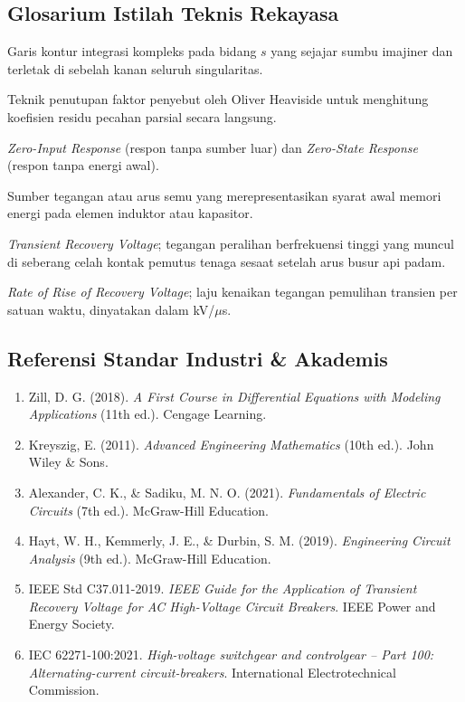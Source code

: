 \documentclass[11pt,a4paper]{article}
\theoremstyle{definition}
\begin{document}
\subsection{Glosarium Istilah Teknis Rekayasa}
\begin{description}[leftmargin=!,labelwidth=3.5cm]
    \item[Bromwich Contour] Garis kontur integrasi kompleks pada bidang $s$ yang sejajar sumbu imajiner dan terletak di sebelah kanan seluruh singularitas.
    \item[Cover-up Method] Teknik penutupan faktor penyebut oleh Oliver Heaviside untuk menghitung koefisien residu pecahan parsial secara langsung.
    \item[ZIR / ZSR] \textit{Zero-Input Response} (respon tanpa sumber luar) dan \textit{Zero-State Response} (respon tanpa energi awal).
    \item[Fictitious Source] Sumber tegangan atau arus semu yang merepresentasikan syarat awal memori energi pada elemen induktor atau kapasitor.
    \item[TRV] \textit{Transient Recovery Voltage}; tegangan peralihan berfrekuensi tinggi yang muncul di seberang celah kontak pemutus tenaga sesaat setelah arus busur api padam.
    \item[RRRV] \textit{Rate of Rise of Recovery Voltage}; laju kenaikan tegangan pemulihan transien per satuan waktu, dinyatakan dalam kV/$\mu$s.
\end{description}

\subsection{Referensi Standar Industri \& Akademis}
\begin{enumerate}[leftmargin=*]
    \item Zill, D. G. (2018). \textit{A First Course in Differential Equations with Modeling Applications} (11th ed.). Cengage Learning.
    \item Kreyszig, E. (2011). \textit{Advanced Engineering Mathematics} (10th ed.). John Wiley \& Sons.
    \item Alexander, C. K., \& Sadiku, M. N. O. (2021). \textit{Fundamentals of Electric Circuits} (7th ed.). McGraw-Hill Education.
    \item Hayt, W. H., Kemmerly, J. E., \& Durbin, S. M. (2019). \textit{Engineering Circuit Analysis} (9th ed.). McGraw-Hill Education.
    \item IEEE Std C37.011-2019. \textit{IEEE Guide for the Application of Transient Recovery Voltage for AC High-Voltage Circuit Breakers}. IEEE Power and Energy Society.
    \item IEC 62271-100:2021. \textit{High-voltage switchgear and controlgear -- Part 100: Alternating-current circuit-breakers}. International Electrotechnical Commission.
\end{enumerate}
\end{document}
